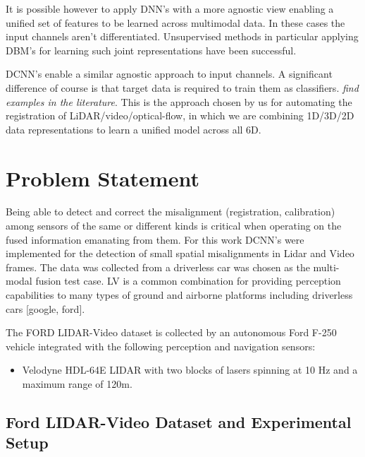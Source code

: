 \documentclass{article}
\begin{document}
It is possible however to apply DNN's with a more agnostic view enabling a unified set of features to be learned across multimodal data. In these cases the input channels aren't differentiated. Unsupervised methods in particular applying DBM's for learning such joint representations have been successful.  

DCNN's enable a similar agnostic approach to input channels. A significant difference of course is that target data is required to train them as classifiers. \emph{find examples in the literature}. This is the approach chosen by us for automating the registration of LiDAR/video/optical-flow, in which we are combining 1D/3D/2D data representations to learn a unified model across all 6D. 




\label{sec:previous_work}





\section{Problem Statement} %
\label{sec:problem_statement}

Being able to detect and correct the misalignment (registration, calibration) among sensors of the same or different kinds is critical when operating on the fused information emanating from them. For this work DCNN's were implemented for the detection of small spatial misalignments in Lidar and Video frames. The data was collected from a driverless car was chosen as the multi-modal fusion test case. LV is a common combination for providing perception capabilities to many types of ground and airborne platforms including driverless cars [google, ford]. 

The FORD LIDAR-Video dataset \cite{Pandey2011Ford-campu} is collected by an autonomous Ford F-250 vehicle integrated with the following perception and navigation sensors:
\begin{itemize}
    \item Velodyne HDL-64E LIDAR with two blocks of lasers spinning at 10 Hz and a maximum range of 120m.
\end{itemize}


\subsection{Ford LIDAR-Video Dataset and Experimental Setup} %
\label{sub:ford_lidar_video_dataset_and_experimental_setup}
\end{document}

